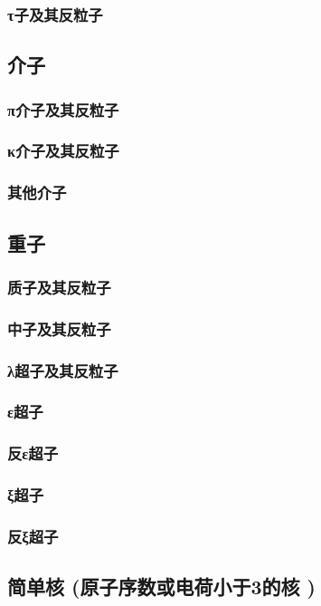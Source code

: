 \documentclass[UTF8]{../06-Physics}
\begin{document}
        \subsubsection{τ子及其反粒子}
    \subsection{介子}
        \subsubsection{π介子及其反粒子}
        \subsubsection{κ介子及其反粒子}
        \subsubsection{其他介子}
    \subsection{重子}
        \subsubsection{质子及其反粒子}
        \subsubsection{中子及其反粒子}
        \subsubsection{λ超子及其反粒子}
        \subsubsection{ε超子}
        \subsubsection{反ε超子}
        \subsubsection{ξ超子}
        \subsubsection{反ξ超子}
    \subsection{简单核 (原子序数或电荷小于3的核 )}
\end{document}
